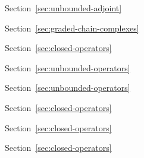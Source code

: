 \par\noindent\hspace*{0em}\label{index:operator}

\par\noindent\hspace*{1em}\label{index:operator-adjoint}\quad Section~\ref{sec:unbounded-adjoint}

\par\noindent\hspace*{1em}\label{index:operator-boundary}\quad Section~\ref{sec:graded-chain-complexes}

\par\noindent\hspace*{1em}\label{index:operator-closed}\quad Section~\ref{sec:closed-operators}

\par\noindent\hspace*{1em}\label{index:operator-densely-defined}\quad Section~\ref{sec:unbounded-operators}

\par\noindent\hspace*{1em}\label{index:operator-domain-of}\quad Section~\ref{sec:unbounded-operators}

\par\noindent\hspace*{1em}\label{index:operator-graph}\quad Section~\ref{sec:closed-operators}

\par\noindent\hspace*{1em}\label{index:operator-null-space}\quad Section~\ref{sec:closed-operators}

\par\noindent\hspace*{1em}\label{index:operator-range}\quad Section~\ref{sec:closed-operators}


